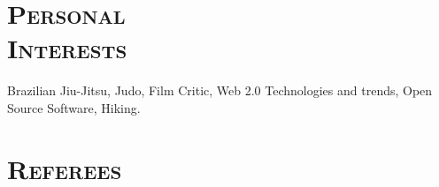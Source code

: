 \begin{resume}


\section{\textsc{Personal\\ Interests}}
\employer{}
\title{}
\location{} 
\dates{}
Brazilian Jiu-Jitsu, Judo, Film Critic, Web 2.0 Technologies and trends, Open Source Software, Hiking.

\section{\textsc{Referees}}



\end{resume}
